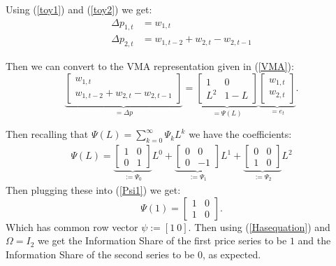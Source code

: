 Using (\ref{toy1}) and (\ref{toy2}) we get:
\begin{align*}
    \Delta p_{1, t} &= w_{1, t} \\
    \Delta p_{2, t} &= w_{1, t-2} + w_{2, t} - w_{2, t-1}
\end{align*}

Then we can convert to the VMA representation given in (\ref{VMA}):
\[
    \underbrace{
    \begin{bmatrix}
    w_{1,t} \\
    w_{1,t-2} + w_{2,t} - w_{2,t-1}
    \end{bmatrix} 
    }_{= \Delta p}
    =
    \underbrace{
    \begin{bmatrix}
    1 & 0 \\
    L^{2}  & 1 - L
    \end{bmatrix}
    }_{= \Psi(L)}
    \underbrace{
    \begin{bmatrix}
    w_{1,t} \\
    w_{2,t}
    \end{bmatrix}
    }_{=e_t}
.\]

Then recalling that $\Psi(L) = \sum_{k=0}^{\infty} \Psi_k L^k$ 
we have the coefficients:
\begin{align*}
    \Psi(L) =
\underbrace{
\begin{bmatrix}
1 & 0 \\
0 & 1
\end{bmatrix}
}_{:= \Psi_0} L^0
+
\underbrace{
\begin{bmatrix}
0 & 0 \\
0 & -1
\end{bmatrix}
}_{:= \Psi_1} L^1
+
\underbrace{
\begin{bmatrix}
0 & 0  \\
1 & 0
\end{bmatrix}
}_{:= \Psi_2}L^{2}
\end{align*}
Then plugging these into (\ref{Psi1}) we get:
\[
    \Psi(1) = \begin{bmatrix} 1 & 0 \\ 1 & 0 \end{bmatrix} 
.\]
Which has common row vector $\psi := [1 ~ 0]$. Then using (\ref{Hasequation})
and $\Omega = I_2$ we get the Information Share of the first price series to be $1$
and the Information Share of the second series to be $0$, as expected.

